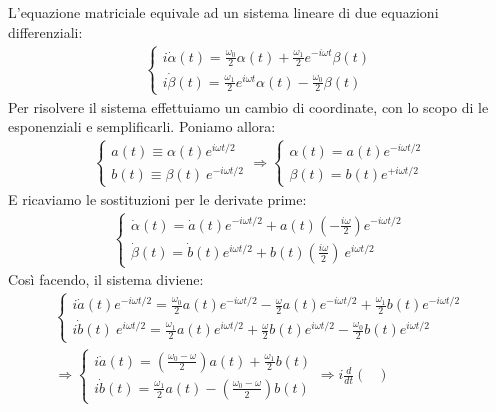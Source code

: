 \documentclass[../../InformazioneQuantistica.tex]{subfiles}
\begin{document}
\begin{enumerate}
L'equazione matriciale equivale ad un sistema lineare di due equazioni differenziali:
\begin{align*}
\begin{cases}
i\dot{\alpha}(t) = \frac{\omega_0}{2}\alpha(t) + \frac{\omega_1}{2}e^{-i\omega t}\beta(t)\\
i\dot{\beta}(t) = \frac{\omega_1}{2} e^{i\omega t} \alpha(t) - \frac{\omega_0}{2} \beta(t)
\end{cases}
\end{align*}
Per risolvere il sistema effettuiamo un cambio di coordinate, con lo scopo di  le esponenziali e semplificarli. Poniamo allora:
\begin{align*}
\begin{cases}
a(t) \equiv \alpha(t) e^{i\omega t/2}\\
b(t) \equiv \beta(t)\ e^{-i\omega t/2}
\end{cases}\Rightarrow \begin{cases}
\alpha(t) = a(t) e^{-i\omega t/2}\\
\beta(t) = b(t) e^{+i\omega t/2}
\end{cases}
\end{align*}
E ricaviamo le sostituzioni per le derivate prime:
\begin{align*}
\begin{cases}
\dot{\alpha}(t) =\dot{a}(t) e^{-i\omega t/2} + a(t) \left(-\frac{i\omega}{2}\right) e^{-i\omega t/2}\\
\dot{\beta}(t) = \dot{b}(t) e^{i\omega t/2} + b(t) \left(\frac{i\omega}{2}\right)\ e^{i\omega t/2} 
\end{cases}
\end{align*}
Così facendo, il sistema diviene:
\begin{align*}
\begin{cases}
i \dot{a}(t) e^{-i\omega t/2} = \frac{\omega_0}{2}a(t) e^{-i\omega t/2} - \frac{\omega}{2} a(t) e^{-i\omega t/2} + \frac{\omega_1}{2}b(t)e^{-i\omega t/2}\\
i\dot{b}(t)\ e^{i\omega t/2} = \frac{\omega_1}{2}a(t) e^{i\omega t/2} + \frac{\omega}{2}b(t) e^{i\omega t/2} -\frac{\omega_0}{2} b(t) e^{i\omega t/2}
\end{cases}\\
\Rightarrow \begin{cases}
i \dot{a}(t) = \left(\frac{\omega_0-\omega}{2}\right) a(t) + \frac{\omega_1}{2}b(t)\\
i\dot{b}(t) = \frac{\omega_1}{2}a(t) - \left(\frac{\omega_0 -\omega}{2}\right) b(t)
\end{cases}\Rightarrow i \frac{d}{dt}\begin{pmatrix}

\end{pmatrix}
\end{align*}
\end{enumerate}
\end{document}
